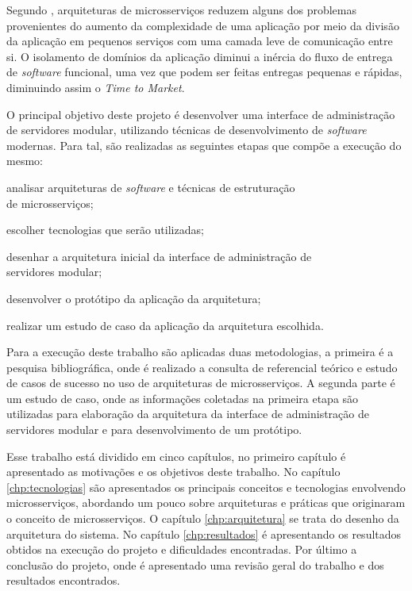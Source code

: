 Segundo , arquiteturas de microsserviços reduzem
alguns dos problemas provenientes do aumento da complexidade de uma aplicação
por meio da divisão da aplicação em pequenos serviços com uma camada leve
de comunicação entre si. O isolamento de domínios da aplicação diminui a
inércia do fluxo de entrega de \emph{software} funcional, uma vez que podem ser
feitas entregas pequenas e rápidas, diminuindo assim o \emph{Time to Market}.

O principal objetivo deste projeto é desenvolver uma interface de
administração de servidores modular, utilizando técnicas de desenvolvimento
de \emph{software} modernas. Para tal, são realizadas as seguintes etapas que compõe
a execução do mesmo:

\begin{alineas}
  \item analisar arquiteturas de \emph{software} e técnicas de estruturação \\
    de microsserviços;
  \item escolher tecnologias que serão utilizadas;
  \item desenhar a arquitetura inicial da interface de administração de \\
    servidores modular;
  \item desenvolver o protótipo da aplicação da arquitetura;
  \item realizar um estudo de caso da aplicação da arquitetura escolhida.
\end{alineas}

Para a execução deste trabalho são aplicadas duas metodologias, a primeira
é a pesquisa bibliográfica, onde é realizado a consulta de referencial
teórico e estudo de casos de sucesso no uso de arquiteturas de microsserviços.
A segunda parte é um estudo de caso, onde as informações coletadas
na primeira etapa são utilizadas para elaboração da arquitetura da interface
de administração de servidores modular e para desenvolvimento de um protótipo.

Esse trabalho está dividido em cinco capítulos, no primeiro capítulo é
apresentado as motivações e os objetivos deste trabalho. No capítulo
\ref{chp:tecnologias} são apresentados os principais conceitos e tecnologias
envolvendo microsserviços, abordando um pouco sobre arquiteturas
e práticas que originaram o conceito de microsserviços. O capítulo
\ref{chp:arquitetura} se trata do desenho da arquitetura do sistema. No
capítulo \ref{chp:resultados} é apresentando os resultados obtidos na execução
do projeto e dificuldades encontradas. Por último a conclusão do projeto,
onde é apresentado uma revisão geral do trabalho e dos resultados encontrados.
